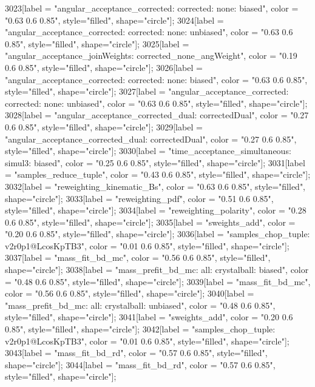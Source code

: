 {	3023[label = "angular_acceptance_corrected\nangacc: corrected\ncsp: none\ntrigger: biased", color = "0.63 0.6 0.85", style="filled", shape="circle"];
	3024[label = "angular_acceptance_corrected\nangacc: corrected\ncsp: none\ntrigger: unbiased", color = "0.63 0.6 0.85", style="filled", shape="circle"];
	3025[label = "angular_acceptance_joinWeights\nwflag: corrected_none_angWeight", color = "0.19 0.6 0.85", style="filled", shape="circle"];
	3026[label = "angular_acceptance_corrected\nangacc: corrected\ncsp: none\ntrigger: biased", color = "0.63 0.6 0.85", style="filled", shape="circle"];
	3027[label = "angular_acceptance_corrected\nangacc: corrected\ncsp: none\ntrigger: unbiased", color = "0.63 0.6 0.85", style="filled", shape="circle"];
	3028[label = "angular_acceptance_corrected_dual\nstep: correctedDual", color = "0.27 0.6 0.85", style="filled", shape="circle"];
	3029[label = "angular_acceptance_corrected_dual\nstep: correctedDual", color = "0.27 0.6 0.85", style="filled", shape="circle"];
	3030[label = "time_acceptance_simultaneous\ntimeacc: simul3\ntrigger: biased", color = "0.25 0.6 0.85", style="filled", shape="circle"];
	3031[label = "samples_reduce_tuple", color = "0.43 0.6 0.85", style="filled", shape="circle"];
	3032[label = "reweighting_kinematic_Bs", color = "0.63 0.6 0.85", style="filled", shape="circle"];
	3033[label = "reweighting_pdf", color = "0.51 0.6 0.85", style="filled", shape="circle"];
	3034[label = "reweighting_polarity", color = "0.28 0.6 0.85", style="filled", shape="circle"];
	3035[label = "sweights_add", color = "0.20 0.6 0.85", style="filled", shape="circle"];
	3036[label = "samples_chop_tuple\nversion: v2r0p1@LcosKpTB3", color = "0.01 0.6 0.85", style="filled", shape="circle"];
	3037[label = "mass_fit_bd_mc", color = "0.56 0.6 0.85", style="filled", shape="circle"];
	3038[label = "mass_prefit_bd_mc\nmassbin: all\nmassmodel: crystalball\ntrigger: biased", color = "0.48 0.6 0.85", style="filled", shape="circle"];
	3039[label = "mass_fit_bd_mc", color = "0.56 0.6 0.85", style="filled", shape="circle"];
	3040[label = "mass_prefit_bd_mc\nmassbin: all\nmassmodel: crystalball\ntrigger: unbiased", color = "0.48 0.6 0.85", style="filled", shape="circle"];
	3041[label = "sweights_add", color = "0.20 0.6 0.85", style="filled", shape="circle"];
	3042[label = "samples_chop_tuple\nversion: v2r0p1@LcosKpTB3", color = "0.01 0.6 0.85", style="filled", shape="circle"];
	3043[label = "mass_fit_bd_rd", color = "0.57 0.6 0.85", style="filled", shape="circle"];
	3044[label = "mass_fit_bd_rd", color = "0.57 0.6 0.85", style="filled", shape="circle"];
}
